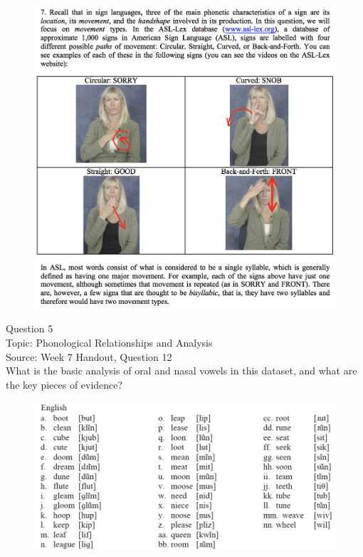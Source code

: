 \documentclass[12pt]{article}
\begin{document}
\begin{figure}[H]
\includegraphics{../images/ASL_movement.png}
\end{figure}

\newpage

{\large Question 5}\\

Topic: Phonological Relationships and Analysis\\
Source: Week 7 Handout, Question 12\\

What is the basic analysis of oral and nasal vowels in this dataset, and what are the key pieces of evidence?\\

\begin{figure}[H]
\includegraphics{../images/english12.png}
\end{figure}
\end{document}
